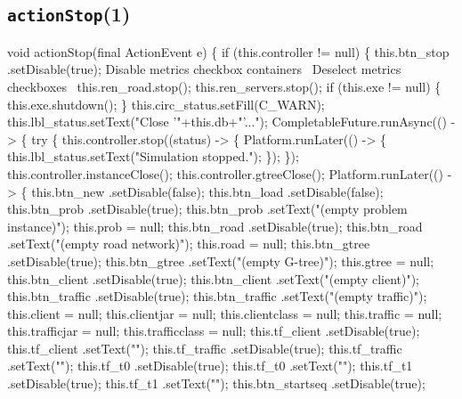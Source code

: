 \subsection{\texttt{actionStop}(1)}
\nwenddocs{}\endmoddef{}
void actionStop(final ActionEvent e) \{
  if (this.controller != null) \{
    this.btn_stop     .setDisable(true);
    \LA{}Disable metrics checkbox containers~{\nwtagstyle{}}\RA{}
    \LA{}Deselect metrics checkboxes~{\nwtagstyle{}}\RA{}
    this.ren_road.stop();
    this.ren_servers.stop();
    if (this.exe != null) \{
      this.exe.shutdown();
    \}
    this.circ_status.setFill(C_WARN);
    this.lbl_status.setText("Close '"+this.db+"'...");
    CompletableFuture.runAsync(() -> \{
      try \{
        this.controller.stop((status) -> \{
          Platform.runLater(() -> \{
            this.lbl_status.setText("Simulation stopped.");
          \});
        \});
        this.controller.instanceClose();
        this.controller.gtreeClose();
        Platform.runLater(() -> \{
          this.btn_new      .setDisable(false);
          this.btn_load     .setDisable(false);
          this.btn_prob     .setDisable(true);
          this.btn_prob     .setText("(empty problem instance)");
          this.prob = null;
          this.btn_road     .setDisable(true);
          this.btn_road     .setText("(empty road network)");
          this.road = null;
          this.btn_gtree    .setDisable(true);
          this.btn_gtree    .setText("(empty G-tree)");
          this.gtree = null;
          this.btn_client   .setDisable(true);
          this.btn_client   .setText("(empty client)");
          this.btn_traffic  .setDisable(true);
          this.btn_traffic  .setText("(empty traffic)");
          this.client = null;
          this.clientjar = null;
          this.clientclass = null;
          this.traffic = null;
          this.trafficjar = null;
          this.trafficclass = null;
          this.tf_client    .setDisable(true);
          this.tf_client    .setText("");
          this.tf_traffic   .setDisable(true);
          this.tf_traffic   .setText("");
          this.tf_t0        .setDisable(true);
          this.tf_t0        .setText("");
          this.tf_t1        .setDisable(true);
          this.tf_t1        .setText("");
          this.btn_startseq .setDisable(true);
